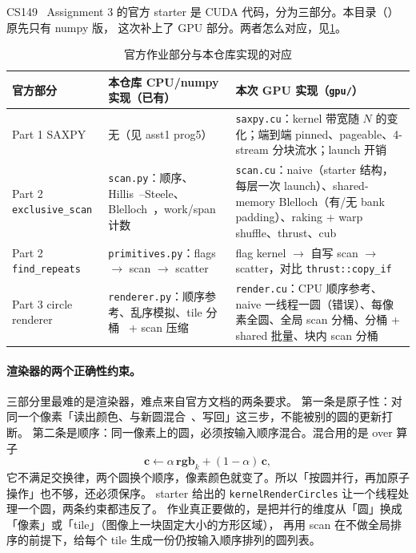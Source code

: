 \documentclass[11pt,a4paper]{ctexart}
\begin{document}
CS149~\cite{cs149} Assignment 3 的官方 starter 是 CUDA 代码，分为三部分。本目录（）原先只有 numpy 版，
这次补上了 GPU 部分。两者怎么对应，见\cref{tab:map}。

\begin{table}[H]
\centering\small
\caption{官方作业部分与本仓库实现的对应}\label{tab:map}
\begin{tabularx}{\linewidth}{p{3.0cm}XX}
\toprule
官方部分 & 本仓库 CPU/numpy 实现（已有） & 本次 GPU 实现（\texttt{gpu/}） \\
\midrule
Part 1 SAXPY & 无（见 asst1 prog5） & \texttt{saxpy.cu}：kernel 带宽随 $N$ 的变化；端到端 pinned、pageable、4-stream 分块流水；launch 开销 \\
Part 2 \texttt{exclusive\_scan} & \texttt{scan.py}：顺序、Hillis~\cite{hillis1986}--Steele、Blelloch~\cite{blelloch1990}，work/span 计数 & \texttt{scan.cu}：naive（starter 结构，每层一次 launch）、shared-memory Blelloch（有/无 bank padding）、raking + warp shuffle、thrust、cub \\
Part 2 \texttt{find\_repeats} & \texttt{primitives.py}：flags $\to$ scan $\to$ scatter & flag kernel $\to$ 自写 scan $\to$ scatter，对比 \texttt{thrust::copy\_if} \\
Part 3 circle renderer & \texttt{renderer.py}：顺序参考、乱序模拟、tile 分桶~\cite{laine2011} + scan 压缩~\cite{sengupta2007} & \texttt{render.cu}：CPU 顺序参考、naive 一线程一圆（错误）、每像素全圆、全局 scan 分桶、分桶 + shared 批量、块内 scan 分桶 \\
\bottomrule
\end{tabularx}
\end{table}

\paragraph{渲染器的两个正确性约束。} 三部分里最难的是渲染器，难点来自官方文档的两条要求。
第一条是原子性：对同一个像素「读出颜色、与新圆混合~\cite{porter1984}、写回」这三步，不能被别的圆的更新打断。
第二条是顺序：同一像素上的圆，必须按输入顺序混合。混合用的是 over 算子
\begin{equation}
\mathbf{c} \leftarrow \alpha\,\mathbf{rgb}_k + (1-\alpha)\,\mathbf{c},\label{eq:over}
\end{equation}
它不满足交换律，两个圆换个顺序，像素颜色就变了。所以「按圆并行，再加原子操作」也不够，还必须保序。
starter 给出的 \texttt{kernelRenderCircles} 让一个线程处理一个圆，两条约束都违反了。
作业真正要做的，是把并行的维度从「圆」换成「像素」或「tile」（图像上一块固定大小的方形区域），
再用 scan 在不做全局排序的前提下，给每个 tile 生成一份仍按输入顺序排列的圆列表。
\end{document}
